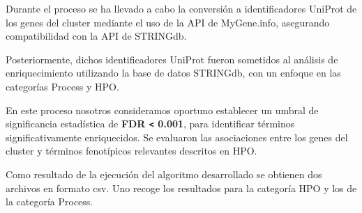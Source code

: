 Durante el proceso se ha llevado a cabo la conversión a identificadores UniProt de los genes del cluster mediante el uso de la API de MyGene.info, asegurando compatibilidad con la API de STRINGdb.

Posteriormente, dichos identificadores UniProt fueron sometidos al análisis de enriquecimiento utilizando la base de datos STRINGdb, con un enfoque en las categorías Process y HPO. 

En este proceso nosotros consideramos oportuno establecer un umbral de significancia estadística de \textbf{ FDR  \texttt< 0.001}, para identificar términos significativamente enriquecidos.
Se evaluaron las asociaciones entre los genes del cluster y términos fenotípicos relevantes descritos en HPO.

Como resultado de la ejecución del algoritmo desarrollado se obtienen dos archivos en formato csv. Uno recoge los resultados para la categoría HPO y los de la categoría Process.
